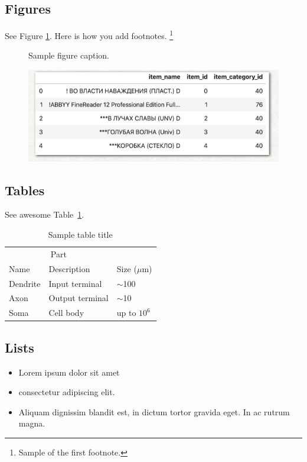 \documentclass{article}
\begin{document}
\subsection{Figures}
\lipsum[10]
See Figure \ref{fig:fig1}. Here is how you add footnotes. \footnote{Sample of the first footnote.}
\lipsum[11]

\begin{figure}
  \centering
  \fbox{\rule[-.5cm]{4cm}{4cm} \rule[-.5cm]{4cm}{0cm}}
  \caption{Sample figure caption.}
  \label{fig:fig1}
\end{figure}

\begin{figure} %
  \centering
  \includegraphics{test.png}
\end{figure}

\subsection{Tables}
\lipsum[12]
See awesome Table~\ref{tab:table}.

\begin{table}
  \caption{Sample table title}
  \centering
  \begin{tabular}{lll}
    \toprule
    \multicolumn{2}{c}{Part}                   \\
    \cmidrule(r){1-2}
    Name     & Description     & Size ($\mu$m) \\
    \midrule
    Dendrite & Input terminal  & $\sim$100     \\
    Axon     & Output terminal & $\sim$10      \\
    Soma     & Cell body       & up to $10^6$  \\
    \bottomrule
  \end{tabular}
  \label{tab:table}
\end{table}

\subsection{Lists}
\begin{itemize}
  \item Lorem ipsum dolor sit amet
  \item consectetur adipiscing elit.
  \item Aliquam dignissim blandit est, in dictum tortor gravida eget. In ac rutrum magna.
\end{itemize}
\end{document}
